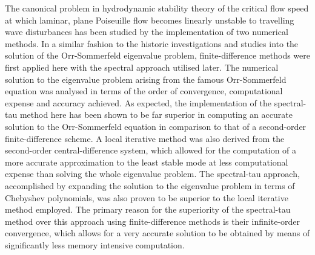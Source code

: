 \documentclass[a4paper, 12pt, twoside, openright]{article}
\numberwithin{equation}{section}
\begin{document}
The canonical problem in hydrodynamic stability theory of the critical flow speed at which laminar, plane Poiseuille flow becomes linearly unstable to travelling wave disturbances has been studied by the implementation of two numerical methods. In a similar fashion to the historic investigations and studies into the solution of the Orr-Sommerfeld eigenvalue problem, finite-difference methods were first applied here with the spectral approach utilised later. The numerical solution to the eigenvalue problem arising from the famous Orr-Sommerfeld equation was analysed in terms of the order of convergence, computational expense and accuracy achieved. As expected, the implementation of the spectral-tau method here has been shown to be far superior in computing an accurate solution to the Orr-Sommerfeld equation in comparison to that of a second-order finite-difference scheme. A local iterative method was also derived from the second-order central-difference system, which allowed for the computation of a more accurate approximation to the least stable mode at less computational expense than solving the whole eigenvalue problem. The spectral-tau approach, accomplished by expanding the solution to the eigenvalue problem in terms of Chebyshev polynomials, was also proven to be superior to the local iterative method employed. The primary reason for the superiority of the spectral-tau method over this approach using finite-difference methods is their infinite-order convergence, which allows for a very accurate solution to be obtained by means of significantly less memory intensive computation.
\end{document}
